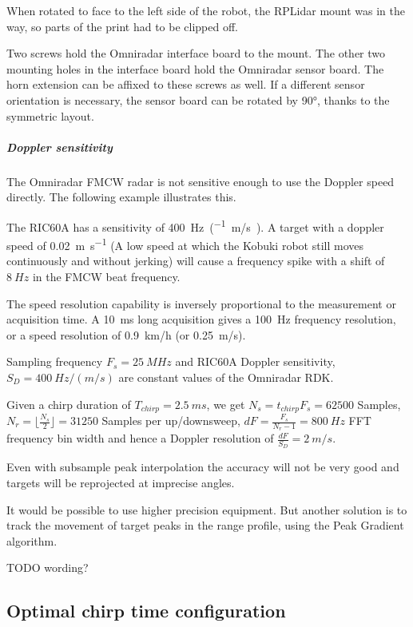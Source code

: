 When rotated to face to the left side of the robot, the RPLidar mount
was in the way, so parts of the print had to be clipped off.

Two screws hold the Omniradar interface board to the mount. The other
two mounting holes in the interface board hold the Omniradar sensor
board. The horn extension can be affixed to these screws as well. If a
different sensor orientation is necessary, the sensor board can be
rotated by \ang{90}, thanks to the symmetric layout.

\subparagraph{Doppler sensitivity}\label{doppler-sensitivity}

The Omniradar FMCW radar is not sensitive enough to use the Doppler
speed directly. The following example illustrates this.

The RIC60A has a sensitivity of \SI{400}{Hz\per(m/s)}. A target with a
doppler speed of \SI{0.02}{m\per s} (A low speed at which the Kobuki robot
still moves continuously and without jerking) will cause a frequency
spike with a shift of \(\SI{8}{Hz}\) in the FMCW beat frequency.

The speed resolution capability is inversely proportional to the
measurement or acquisition time. A \SI{10}{ms} long acquisition gives a \SI{100}{Hz}
frequency resolution, or a speed resolution of \SI{0.9}{km/h} (or \SI{0.25}{m/s}).

Sampling frequency \(F_s=\SI{25}{MHz}\) and RIC60A Doppler sensitivity,
\(S_D = \SI{400}{Hz\per(m/s)}\) are constant values of the Omniradar RDK.

Given a chirp duration of \(T_{chirp} = \SI{2.5}{ms}\), we get
\(N_s = t_{chirp} F_s = 62500\) Samples,
\(N_r = \lfloor \frac{N_s}{2} \rfloor = 31250\) Samples per
up/downsweep, \(dF = \frac{F_s}{N_r - 1} = \SI{800}{Hz}\) FFT frequency bin
width and hence a Doppler resolution of \(\frac{dF}{S_D} = \SI{2}{m/s}\).

Even with subsample peak interpolation the accuracy will not be very
good and targets will be reprojected at imprecise angles.

It would be possible to use higher precision equipment. But another
solution is to track the movement of target peaks in the range profile,
using the Peak Gradient algorithm.

TODO wording?

\subsection{Optimal chirp time configuration}\label{optimal-chirp-time-configuration}

